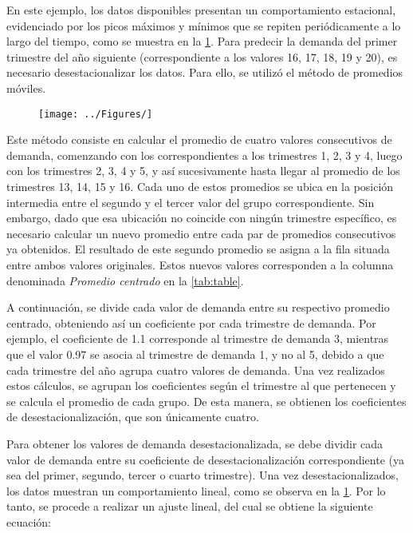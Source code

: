 En este ejemplo, los datos disponibles presentan un comportamiento estacional, 
evidenciado por los picos máximos y mínimos que se repiten periódicamente a lo 
largo del tiempo, como se muestra en la \cref{fig:graphic1}. Para predecir la 
demanda del primer trimestre del año siguiente (correspondiente a los valores 
16, 17, 18, 19 y 20), es necesario desestacionalizar los datos. Para ello, se 
utilizó el método de promedios móviles.

\begin{figure}[H]
  \centering
  \texttt{[image: ../Figures/]}
  \label{fig:graphic1}
\end{figure}

Este método consiste en calcular el promedio de cuatro valores consecutivos de 
demanda, comenzando con los correspondientes a los trimestres 1, 2, 3 y 4, 
luego con los trimestres 2, 3, 4 y 5, y así sucesivamente hasta llegar al 
promedio de los trimestres 13, 14, 15 y 16. Cada uno de estos promedios se 
ubica en la posición intermedia entre el segundo y el tercer valor del grupo 
correspondiente. Sin embargo, dado que esa ubicación no coincide con ningún 
trimestre específico, es necesario calcular un nuevo promedio entre cada par de 
promedios consecutivos ya obtenidos. El resultado de este segundo promedio se 
asigna a la fila situada entre ambos valores originales. Estos nuevos valores 
corresponden a la columna denominada \textit{Promedio centrado} en la 
\cref{tab:table}.

A continuación, se divide cada valor de demanda entre su respectivo promedio 
centrado, obteniendo así un coeficiente por cada trimestre de demanda. Por 
ejemplo, el coeficiente de 1.1 corresponde al trimestre de demanda 3, mientras 
que el valor 0.97 se asocia al trimestre de demanda 1, y no al 5, debido a que 
cada trimestre del año agrupa cuatro valores de demanda. Una vez realizados 
estos cálculos, se agrupan los coeficientes según el trimestre al que 
pertenecen y se calcula el promedio de cada grupo. De esta manera, se obtienen 
los coeficientes de desestacionalización, que son únicamente cuatro.

Para obtener los valores de demanda desestacionalizada, se debe dividir cada 
valor de demanda entre su coeficiente de desestacionalización correspondiente 
(ya sea del primer, segundo, tercer o cuarto trimestre). Una vez 
desestacionalizados, los datos muestran un comportamiento lineal, como se 
observa en la \cref{fig:graphic1}. Por lo tanto, se procede a realizar un ajuste 
lineal, del cual se obtiene la siguiente ecuación:

